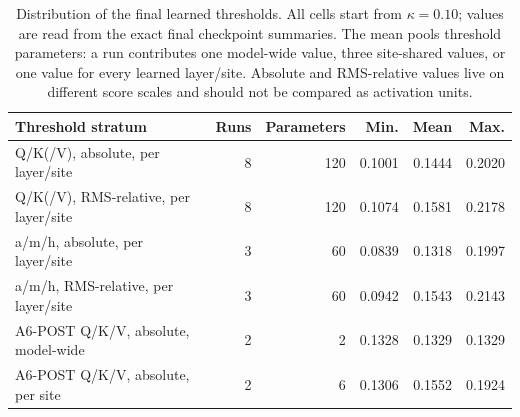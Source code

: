 \begin{table}[H]
\centering
\footnotesize
\setlength{\tabcolsep}{4.0pt}
\caption{Distribution of the final learned thresholds. All cells start from $\kappa=0.10$; values are read from the exact final checkpoint summaries. The mean pools threshold parameters: a run contributes one model-wide value, three site-shared values, or one value for every learned layer/site. Absolute and RMS-relative values live on different score scales and should not be compared as activation units.}
\label{tab:b2-kappa}
\begin{tabularx}{\textwidth}{X r r r r r}
\toprule
Threshold stratum & Runs & Parameters & Min. & Mean & Max. \\
\midrule
Q/K(/V), absolute, per layer/site & 8 & 120 & 0.1001 & 0.1444 & 0.2020 \\
Q/K(/V), RMS-relative, per layer/site & 8 & 120 & 0.1074 & 0.1581 & 0.2178 \\
a/m/h, absolute, per layer/site & 3 & 60 & 0.0839 & 0.1318 & 0.1997 \\
a/m/h, RMS-relative, per layer/site & 3 & 60 & 0.0942 & 0.1543 & 0.2143 \\
A6-POST Q/K/V, absolute, model-wide & 2 & 2 & 0.1328 & 0.1329 & 0.1329 \\
A6-POST Q/K/V, absolute, per site & 2 & 6 & 0.1306 & 0.1552 & 0.1924 \\
\bottomrule
\end{tabularx}
\end{table}
